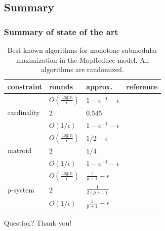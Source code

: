 \documentclass{beamer}
\newcommand{\eps}{\epsilon}
\begin{document}
\subsection{Summary}
\begin{frame}
\frametitle{Summary of state of the art}
\begin{table}
\centering
\begin{tabular}{|l|l|l|l|}
\hline
constraint & rounds  &  approx. & reference \\
\hline
\multirow{3}{*}{cardinality} & $O(\frac{\log n}{\eps})$& $1-e^{-1}-\eps$ & \cite{KMV+15}\\
\cline{2-4}
                             & $2$ & $0.545$ & \cite{MZ15} \\
\cline{2-4}
                             & $O(1/\eps)$ & $1 - e^{-1}-\eps$ & \cite{BAN+2015new} \\

\hline


\multirow{3}{*}{matroid}     & $O(\frac{\log n}{\eps})$ & $1/2 - \eps$ & \cite{KMV+15} \\
\cline{2-4}
                             & $2$ & $1/4$ & \cite{DEN+15} \\
\cline{2-4}
                             & $O(1/\eps)$ & $1 - e^{-1}-\eps$ & \cite{BAN+2015new} \\
\hline
\multirow{3}{*}{p-system}     & $O(\frac{\log n}{\eps})$ & $\frac{1}{p+1} - \eps$ & \cite{KMV+15} \\
\cline{2-4}
                            & $2$  & $\frac{1}{2(p + 1)}$ & \cite{DEN+15} \\
\cline{2-4}      
                           & $O(1/\eps)$ & $\frac{1}{p + 1} - \eps$ & \cite{BAN+2015new}\\
\hline
\end{tabular}
\caption{Best known algorithms  for monotone submodular maximization in the MapReduce model. All algorithms are randomized.}
\label{table:distributed}
\end{table}

\end{frame}


\begin{frame}
\Huge{\centerline{Question? Thank you!}}
\end{frame}






\end{document}
